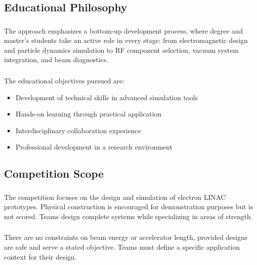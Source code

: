 \subsection{Educational Philosophy}

\subsubsection{}
The approach emphasizes a bottom-up development process, where degree and master's students take an active role in every stage: from electromagnetic design and particle dynamics simulation to RF component selection, vacuum system integration, and beam diagnostics.

\subsubsection{}
The educational objectives pursued are:
\begin{itemize}[noitemsep]
    \item Development of technical skills in advanced simulation tools
    \item Hands-on learning through practical application
    \item Interdisciplinary collaboration experience
    \item Professional development in a research environment
\end{itemize}

\subsection{Competition Scope}

\subsubsection{}
The competition focuses on the design and simulation of electron LINAC prototypes. Physical construction is encouraged for demonstration purposes but is not scored. Teams design complete systems while specializing in areas of strength.

\subsubsection{}
There are no constraints on beam energy or accelerator length, provided designs are safe and serve a stated objective. Teams must define a specific application context for their design.